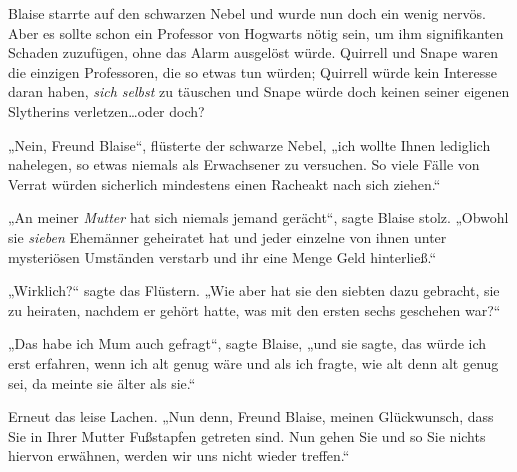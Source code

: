 Blaise starrte auf den schwarzen Nebel und wurde nun doch ein wenig nervös. Aber es sollte schon ein Professor von Hogwarts nötig sein, um ihm signifikanten Schaden zuzufügen, ohne das Alarm ausgelöst würde. Quirrell und Snape waren die einzigen Professoren, die so etwas tun würden; Quirrell würde kein Interesse daran haben, \emph{sich selbst} zu täuschen und Snape würde doch keinen seiner eigenen Slytherins verletzen…oder doch?

„Nein, Freund Blaise“, flüsterte der schwarze Nebel, „ich wollte Ihnen lediglich nahelegen, so etwas niemals als Erwachsener zu versuchen. So viele Fälle von Verrat würden sicherlich mindestens einen Racheakt nach sich ziehen.“

„An meiner \emph{Mutter} hat sich niemals jemand gerächt“, sagte Blaise stolz.
„Obwohl sie \emph{sieben} Ehemänner geheiratet hat und jeder einzelne von ihnen unter mysteriösen Umständen verstarb und ihr eine Menge Geld hinterließ.“

„Wirklich?“ sagte das Flüstern.
„Wie aber hat sie den siebten dazu gebracht, sie zu heiraten, nachdem er gehört hatte, was mit den ersten sechs geschehen war?“

„Das habe ich Mum auch gefragt“, sagte Blaise, „und sie sagte, das würde ich erst erfahren, wenn ich alt genug wäre und als ich fragte, wie alt denn alt genug sei, da meinte sie älter als sie.“

Erneut das leise Lachen.
„Nun denn, Freund Blaise, meinen Glückwunsch, dass Sie in Ihrer Mutter Fußstapfen getreten sind. Nun gehen Sie und so Sie nichts hiervon erwähnen, werden wir uns nicht wieder treffen.“

